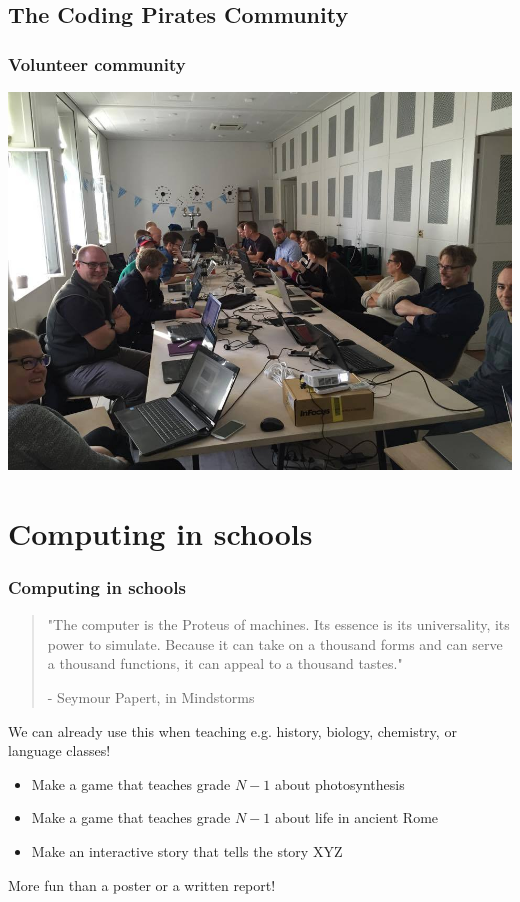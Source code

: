 \documentclass{beamer}
\begin{document}
\subsection{The Coding Pirates Community}
\begin{frame}
  \frametitle{Volunteer community}
  \includegraphics[width=\textwidth]{imagery/unity-for-volunteers.jpg}
\end{frame}


\section{Computing in schools}
\begin{frame}
  \frametitle{Computing in schools}
  \begin{quotation}
    "The computer is the Proteus of machines. Its essence is its
    universality, its power to simulate. Because it can take on a
    thousand forms and can serve a thousand functions, it can appeal
    to a thousand tastes."

    - Seymour Papert, in Mindstorms
  \end{quotation}

  We can already use this when teaching e.g. history, biology, chemistry,
  or language classes!

  \begin{itemize}
  \item Make a game that teaches grade $N-1$ about photosynthesis
  \item Make a game that teaches grade $N-1$ about life in ancient Rome
  \item Make an interactive story that tells the story XYZ
  \end{itemize}

  More fun than a poster or a written report!
\end{frame}
\end{document}
